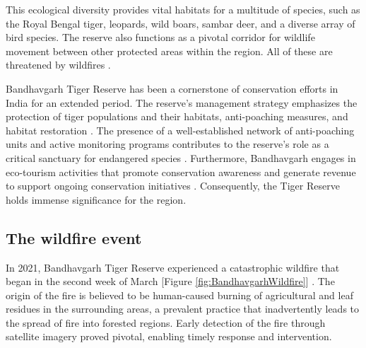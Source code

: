 \documentclass[
  12 pt,
]{Nemilov}
\begin{document}
This ecological diversity provides vital habitats for a multitude of species, such as the Royal Bengal tiger, leopards, wild boars, sambar deer, and a diverse array of bird species. The reserve also functions as a pivotal corridor for wildlife movement between other protected areas within the region. All of these are threatened by wildfires \citep{pati2024impacts}.

Bandhavgarh Tiger Reserve has been a cornerstone of conservation efforts in India for an extended period. The reserve's management strategy emphasizes the protection of tiger populations and their habitats, anti-poaching measures, and habitat restoration \citep{nath2000conservation}. The presence of a well-established network of anti-poaching units and active monitoring programs contributes to the reserve's role as a critical sanctuary for endangered species \citep{chouksey2018assessments}. Furthermore, Bandhavgarh engages in eco-tourism activities that promote conservation awareness and generate revenue to support ongoing conservation initiatives \citep{kishnani2019sustainable}. Consequently, the Tiger Reserve holds immense significance for the region.

\subsection{The wildfire event}\label{the-wildfire-event}

In 2021, Bandhavgarh Tiger Reserve experienced a catastrophic wildfire that began in the second week of March {[}Figure \ref{fig:BandhavgarhWildfire}{]} \citep{pati2024impacts}. The origin of the fire is believed to be human-caused burning of agricultural and leaf residues in the surrounding areas, a prevalent practice that inadvertently leads to the spread of fire into forested regions. Early detection of the fire through satellite imagery proved pivotal, enabling timely response and intervention.
\end{document}
